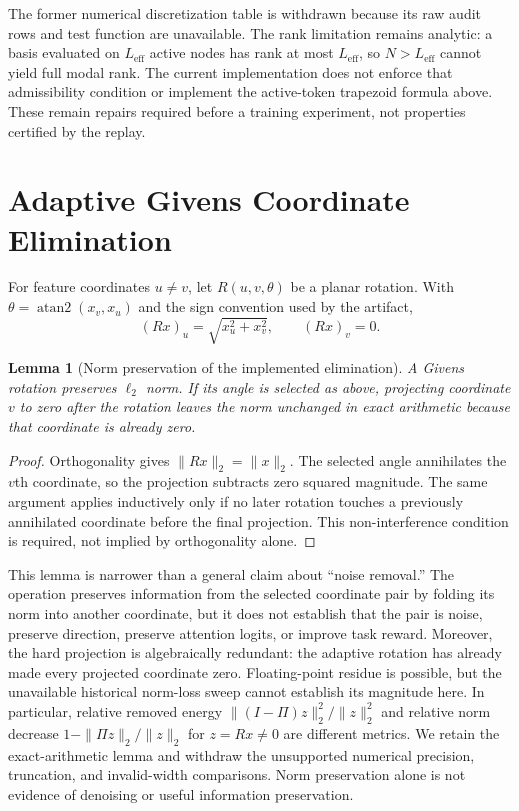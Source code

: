 \documentclass{article}
\newtheorem{lemma}{Lemma}
\begin{document}
The former numerical discretization table is withdrawn because its raw audit
rows and test function are unavailable. The rank limitation remains analytic:
a basis evaluated on $L_{\mathrm{eff}}$ active nodes has rank at most
$L_{\mathrm{eff}}$, so $N>L_{\mathrm{eff}}$ cannot yield full modal rank.
The current implementation does not enforce that admissibility condition
or implement the active-token trapezoid formula above. These remain repairs
required before a training experiment, not properties certified by the replay.

\section{Adaptive Givens Coordinate Elimination}

For feature coordinates $u\ne v$, let $R(u,v,\theta)$ be a planar rotation. With
$\theta=\operatorname{atan2}(x_v,x_u)$ and the sign convention used by the
artifact,
\begin{equation}
  (Rx)_u=\sqrt{x_u^2+x_v^2},
  \qquad
  (Rx)_v=0.
\end{equation}

\begin{lemma}[Norm preservation of the implemented elimination]
A Givens rotation preserves $\ell_2$ norm.  If its angle is selected as above,
projecting coordinate $v$ to zero after the rotation leaves the norm unchanged
in exact arithmetic because that coordinate is already zero.
\end{lemma}

\begin{proof}
Orthogonality gives $\|Rx\|_2=\|x\|_2$. The selected angle annihilates the
$v$th coordinate, so the projection subtracts zero squared magnitude. The
same argument applies inductively only if no later rotation touches a
previously annihilated coordinate before the final projection. This
non-interference condition is required, not implied by orthogonality alone.
\end{proof}

This lemma is narrower than a general claim about ``noise removal.''  The
operation preserves information from the selected coordinate pair by folding
its norm into another coordinate, but it does not establish that the pair is
noise, preserve direction, preserve attention logits, or improve task reward.
Moreover, the hard projection is algebraically redundant: the adaptive
rotation has already made every projected coordinate zero. Floating-point
residue is possible, but the unavailable historical norm-loss sweep cannot
establish its magnitude here. In particular, relative removed energy
$\|(I-\Pi)z\|_2^2/\|z\|_2^2$ and relative norm decrease
$1-\|\Pi z\|_2/\|z\|_2$ for $z=Rx\ne0$ are different metrics.
We retain the exact-arithmetic lemma and withdraw the unsupported numerical
precision, truncation, and invalid-width comparisons. Norm preservation alone
is not evidence of denoising or useful information preservation.
\end{document}
